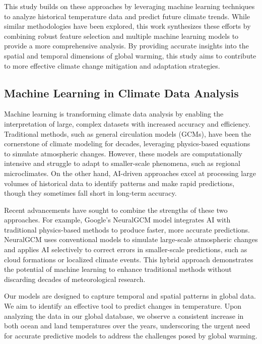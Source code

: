 \documentclass[conference]{IEEEtran}
\begin{document}
This study builds on these approaches by leveraging machine learning techniques to analyze historical temperature data and predict future climate trends. While similar methodologies have been explored, this work synthesizes these efforts by combining robust feature selection and multiple machine learning models to provide a more comprehensive analysis. By providing accurate insights into the spatial and temporal dimensions of global warming, this study aims to contribute to more effective climate change mitigation and adaptation strategies.

\subsection{Machine Learning in Climate Data Analysis}
Machine learning is transforming climate data analysis by enabling the interpretation of large, complex datasets with increased accuracy and efficiency. Traditional methods, such as general circulation models (GCMs), have been the cornerstone of climate modeling for decades, leveraging physics-based equations to simulate atmospheric changes. However, these models are computationally intensive and struggle to adapt to smaller-scale phenomena, such as regional microclimates. On the other hand, AI-driven approaches excel at processing large volumes of historical data to identify patterns and make rapid predictions, though they sometimes fall short in long-term accuracy\cite{b10}.

Recent advancements have sought to combine the strengths of these two approaches. For example, Google’s NeuralGCM model integrates AI with traditional physics-based methods to produce faster, more accurate predictions. NeuralGCM uses conventional models to simulate large-scale atmospheric changes and applies AI selectively to correct errors in smaller-scale predictions, such as cloud formations or localized climate events\cite{b11}. This hybrid approach demonstrates the potential of machine learning to enhance traditional methods without discarding decades of meteorological research.

Our models are designed to capture temporal and spatial patterns in global data. We aim to identify an effective tool to predict changes in temperature. Upon analyzing the data in our global database, we observe a consistent increase in both ocean and land temperatures over the years, underscoring the urgent need for accurate predictive models to address the challenges posed by global warming.
\end{document}
